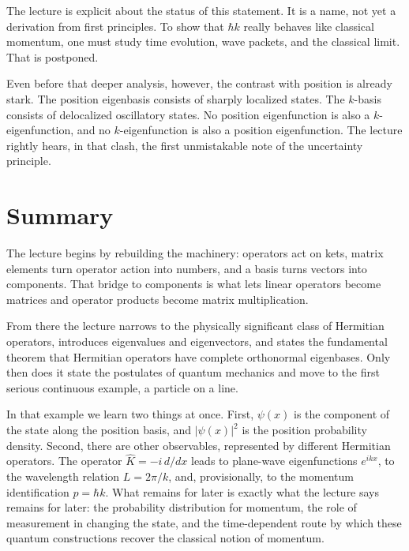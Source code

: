 The lecture is explicit about the status of this statement. It is a name, not yet a derivation from first principles. To show that \(\hbar k\) really behaves like classical momentum, one must study time evolution, wave packets, and the classical limit. That is postponed.

Even before that deeper analysis, however, the contrast with position is already stark. The position eigenbasis consists of sharply localized states. The \(k\)-basis consists of delocalized oscillatory states. No position eigenfunction is also a \(k\)-eigenfunction, and no \(k\)-eigenfunction is also a position eigenfunction. The lecture rightly hears, in that clash, the first unmistakable note of the uncertainty principle.

\section{Summary}

The lecture begins by rebuilding the machinery: operators act on kets, matrix elements turn operator action into numbers, and a basis turns vectors into components. That bridge to components is what lets linear operators become matrices and operator products become matrix multiplication.

From there the lecture narrows to the physically significant class of Hermitian operators, introduces eigenvalues and eigenvectors, and states the fundamental theorem that Hermitian operators have complete orthonormal eigenbases. Only then does it state the postulates of quantum mechanics and move to the first serious continuous example, a particle on a line.

In that example we learn two things at once. First, \(\psi(x)\) is the component of the state along the position basis, and \(|\psi(x)|^2\) is the position probability density. Second, there are other observables, represented by different Hermitian operators. The operator \(\hat K=-i\,d/dx\) leads to plane-wave eigenfunctions \(e^{ikx}\), to the wavelength relation \(L=2\pi/k\), and, provisionally, to the momentum identification \(p=\hbar k\). What remains for later is exactly what the lecture says remains for later: the probability distribution for momentum, the role of measurement in changing the state, and the time-dependent route by which these quantum constructions recover the classical notion of momentum.
